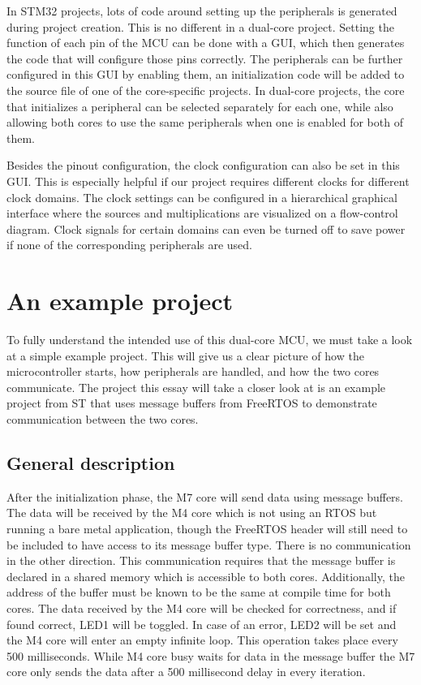 In STM32 projects, lots of code around setting up the peripherals is generated during project creation. This is no different in a dual-core project. Setting the function of each pin of the MCU can be done with a GUI, which then generates the code that will configure those pins correctly. The peripherals can be further configured in this GUI by enabling them, an initialization code will be added to the  source file of one of the core-specific projects. In dual-core projects, the core that initializes a peripheral can be selected separately for each one, while also allowing both cores to use the same peripherals when one is enabled for both of them.

Besides the pinout configuration, the clock configuration can also be set in this GUI. This is especially helpful if our project requires different clocks for different clock domains. The clock settings can be configured in a hierarchical graphical interface where the sources and multiplications are visualized on a flow-control diagram. Clock signals for certain domains can even be turned off to save power if none of the corresponding peripherals are used.

\section{An example project}

To fully understand the intended use of this dual-core MCU, we must take a look at a simple example project. This will give us a clear picture of how the microcontroller starts, how peripherals are handled, and how the two cores communicate. The project this essay will take a closer look at is an example project from ST that uses message buffers from FreeRTOS to demonstrate communication between the two cores. \cite{CDemo}

\subsection{General description}

After the initialization phase, the M7 core will send data using message buffers. The data will be received by the M4 core which is not using an RTOS but running a bare metal application, though the FreeRTOS header will still need to be included to have access to its message buffer type. There is no communication in the other direction. This communication requires that the message buffer is declared in a shared memory which is accessible to both cores. Additionally, the address of the buffer must be known to be the same at compile time for both cores. The data received by the M4 core will be checked for correctness, and if found correct, LED1 will be toggled. In case of an error, LED2 will be set and the M4 core will enter an empty infinite loop. This operation takes place every 500 milliseconds. While M4 core busy waits for data in the message buffer the M7 core only sends the data after a 500 millisecond delay in every iteration.

